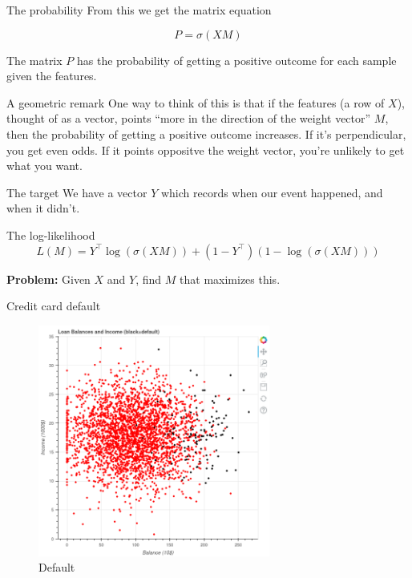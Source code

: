 \documentclass[
  ignorenonframetext,
]{beamer}
\begin{document}
\begin{frame}{The probability}
\protect\hypertarget{the-probability}{}
From this we get the matrix equation

\[
P = \sigma(XM)
\]

The matrix \(P\) has the probability of getting a positive outcome for
each sample given the features.
\end{frame}

\begin{frame}{A geometric remark}
\protect\hypertarget{a-geometric-remark}{}
One way to think of this is that if the features (a row of \(X\)),
thought of as a vector, points ``more in the direction of the weight
vector'' \(M\), then the probability of getting a positive outcome
increases. If it's perpendicular, you get even odds. If it points
oppositve the weight vector, you're unlikely to get what you want.
\end{frame}

\begin{frame}{The target}
\protect\hypertarget{the-target}{}
We have a vector \(Y\) which records when our event happened, and when
it didn't.
\end{frame}

\begin{frame}{The log-likelihood}
\protect\hypertarget{the-log-likelihood-1}{}
\[
L(M) = Y^{\intercal}\log(\sigma(XM))+(1-Y^{\intercal})(1-\log(\sigma(XM)))
\]

\textbf{Problem:} Given \(X\) and \(Y\), find \(M\) that maximizes this.
\end{frame}

\begin{frame}{Credit card default}
\protect\hypertarget{credit-card-default}{}
\begin{figure}
\centering
\includegraphics[width=\textwidth,height=3in]{scatter_default.png}
\caption{Default}
\end{figure}
\end{frame}
\end{document}
